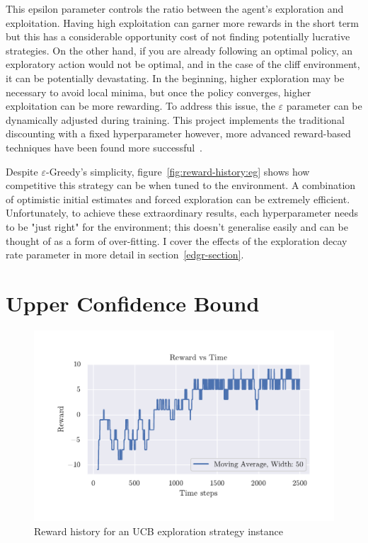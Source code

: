 \documentclass[]{final_report}
\begin{document}
This epsilon parameter controls the ratio between the agent's exploration and exploitation. Having high exploitation can garner more rewards in the short term but this has a considerable opportunity cost of not finding potentially lucrative strategies. On the other hand, if you are already following an optimal policy, an exploratory action would not be optimal, and in the case of the cliff environment, it can be potentially devastating. In the beginning, higher exploration may be necessary to avoid local minima, but once the policy converges, higher exploitation can be more rewarding. To address this issue, the $\varepsilon$ parameter can be dynamically adjusted during training. This project implements the traditional discounting with a fixed hyperparameter however, more advanced reward-based techniques have been found more successful~\cite{rewardEpsilonDecay}.

Despite $\varepsilon$-Greedy's simplicity, figure~\ref{fig:reward-history:eg} shows how competitive this strategy can be when tuned to the environment. A combination of optimistic initial estimates and forced exploration can be extremely efficient. Unfortunately, to achieve these extraordinary results, each hyperparameter needs to be "just right" for the environment; this doesn't generalise easily and can be thought of as a form of over-fitting. I cover the effects of the exploration decay rate parameter in more detail in section~\ref{edgr-section}.


\section{Upper Confidence Bound}

\begin{figure}[H]
  \centering
  
  \includegraphics[trim={0 1cm 0 1cm},clip,width=\textwidth]{reward-history/UCB.pdf}
  
  \caption{\label{fig:reward-history:ucb} Reward history for an UCB exploration strategy instance}
\end{figure}
\end{document}
